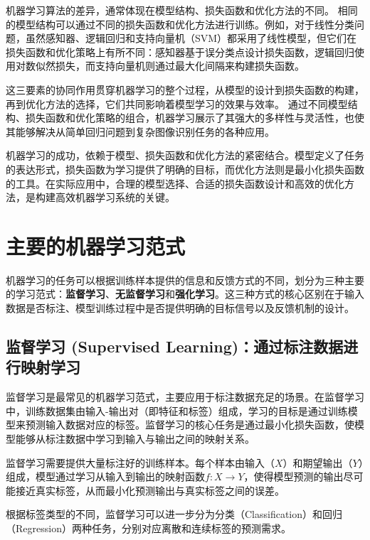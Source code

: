 机器学习算法的差异，通常体现在模型结构、损失函数和优化方法的不同。
相同的模型结构可以通过不同的损失函数和优化方法进行训练。例如，对于线性分类问题，虽然感知器、逻辑回归和支持向量机（SVM）都采用了线性模型，但它们在损失函数和优化策略上有所不同：感知器基于误分类点设计损失函数，逻辑回归使用对数似然损失，而支持向量机则通过最大化间隔来构建损失函数。

这三要素的协同作用贯穿机器学习的整个过程，从模型的设计到损失函数的构建，再到优化方法的选择，它们共同影响着模型学习的效果与效率。
通过不同模型结构、损失函数和优化策略的组合，机器学习展示了其强大的多样性与灵活性，也使其能够解决从简单回归问题到复杂图像识别任务的各种应用。

机器学习的成功，依赖于模型、损失函数和优化方法的紧密结合。模型定义了任务的表达形式，损失函数为学习提供了明确的目标，而优化方法则是最小化损失函数的工具。在实际应用中，合理的模型选择、合适的损失函数设计和高效的优化方法，是构建高效机器学习系统的关键。

 \section{主要的机器学习范式}

机器学习的任务可以根据训练样本提供的信息和反馈方式的不同，划分为三种主要的学习范式：{\bf 监督学习}、{\bf 无监督学习}和{\bf 强化学习}。这三种方式的核心区别在于输入数据是否标注、模型训练过程中是否提供明确的目标信号以及反馈机制的设计。

\subsection{ 监督学习 (Supervised Learning)：通过标注数据进行映射学习}
监督学习是最常见的机器学习范式，主要应用于标注数据充足的场景。在监督学习中，训练数据集由输入-输出对（即特征和标签）组成，学习的目标是通过训练模型来预测输入数据对应的标签。监督学习的核心任务是通过最小化损失函数，使模型能够从标注数据中学习到输入与输出之间的映射关系。

监督学习需要提供大量标注好的训练样本。每个样本由输入（$X$）和期望输出（$Y$）组成，模型通过学习从输入到输出的映射函数$f: X \rightarrow Y$，使得模型预测的输出尽可能接近真实标签，从而最小化预测输出与真实标签之间的误差。

根据标签类型的不同，监督学习可以进一步分为分类（Classification）和回归（Regression）两种任务，分别对应离散和连续标签的预测需求。

